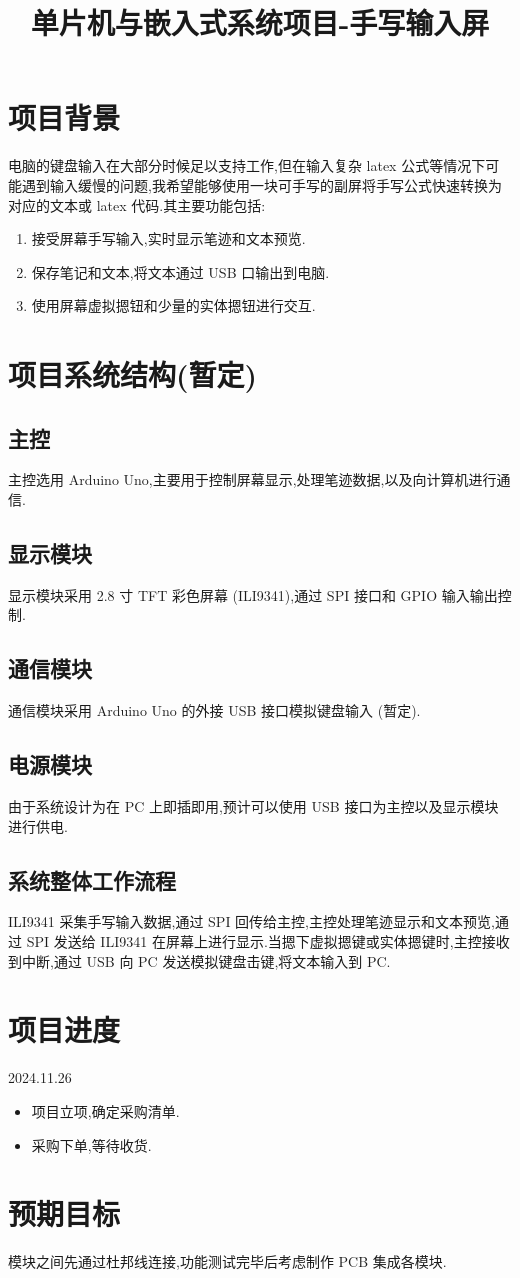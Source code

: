 
\usepackage{../../homeworks_preamble}
\title{单片机与嵌入式系统项目-手写输入屏}


    \maketitle
    \section{项目背景}
    电脑的键盘输入在大部分时候足以支持工作,但在输入复杂 latex 公式等情况下可能遇到输入缓慢的问题,我希望能够使用一块可手写的副屏将手写公式快速转换为对应的文本或 latex 代码.其主要功能包括:
    \begin{enumerate}
        \item 接受屏幕手写输入,实时显示笔迹和文本预览.
        \item 保存笔记和文本,将文本通过 USB 口输出到电脑.
        \item 使用屏幕虚拟摁钮和少量的实体摁钮进行交互.
    \end{enumerate}
    \section{项目系统结构(暂定)}
        \subsection{主控}
            主控选用 Arduino Uno,主要用于控制屏幕显示,处理笔迹数据,以及向计算机进行通信.
        \subsection{显示模块}
            显示模块采用 2.8 寸 TFT 彩色屏幕 (ILI9341),通过 SPI 接口和 GPIO 输入输出控制.
        \subsection{通信模块}
            通信模块采用 Arduino Uno 的外接 USB 接口模拟键盘输入 (暂定).
        \subsection{电源模块}
            由于系统设计为在 PC 上即插即用,预计可以使用 USB 接口为主控以及显示模块进行供电.
        \subsection{系统整体工作流程}
            ILI9341 采集手写输入数据,通过 SPI 回传给主控,主控处理笔迹显示和文本预览,通过 SPI 发送给 ILI9341 在屏幕上进行显示.当摁下虚拟摁键或实体摁键时,主控接收到中断,通过 USB 向 PC 发送模拟键盘击键,将文本输入到 PC.
    \section{项目进度}
        2024.11.26
        \begin{itemize}
            \item 项目立项,确定采购清单.
            \item 采购下单,等待收货.
        \end{itemize}
    \section{预期目标}
        模块之间先通过杜邦线连接,功能测试完毕后考虑制作 PCB 集成各模块.

